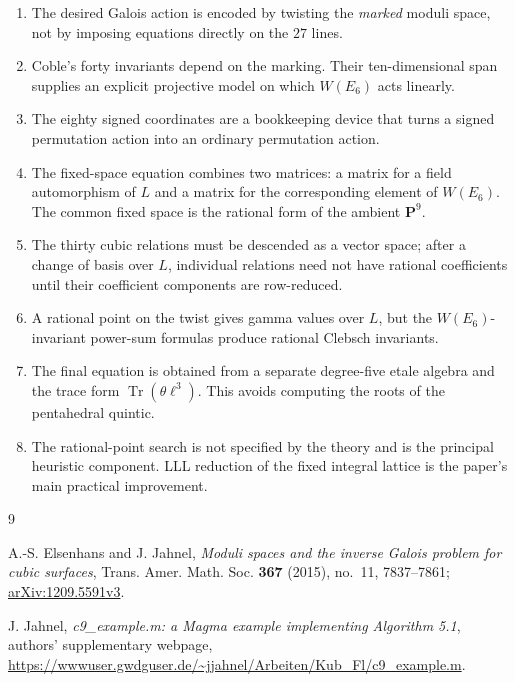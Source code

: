 \documentclass[11pt]{article}
\newcommand{\PP}{\mathbf{P}}
\newcommand{\Tr}{\operatorname{Tr}}
\begin{document}
\begin{enumerate}
\item The desired Galois action is encoded by twisting the \emph{marked}
moduli space, not by imposing equations directly on the $27$ lines.

\item Coble's forty invariants depend on the marking.  Their ten-dimensional
span supplies an explicit projective model on which $W(E_6)$ acts linearly.

\item The eighty signed coordinates are a bookkeeping device that turns a
signed permutation action into an ordinary permutation action.

\item The fixed-space equation combines two matrices: a matrix for a field
automorphism of $L$ and a matrix for the corresponding element of $W(E_6)$.
The common fixed space is the rational form of the ambient $\PP^9$.

\item The thirty cubic relations must be descended as a vector space; after a
change of basis over $L$, individual relations need not have rational
coefficients until their coefficient components are row-reduced.

\item A rational point on the twist gives gamma values over $L$, but the
$W(E_6)$-invariant power-sum formulas produce rational Clebsch invariants.

\item The final equation is obtained from a separate degree-five etale algebra
and the trace form $\Tr(\theta\ell^3)$.  This avoids computing the roots of the
pentahedral quintic.

\item The rational-point search is not specified by the theory and is the
principal heuristic component.  LLL reduction of the fixed integral lattice
is the paper's main practical improvement.
\end{enumerate}

\begin{thebibliography}{9}

A.-S. Elsenhans and J. Jahnel,
\emph{Moduli spaces and the inverse Galois problem for cubic surfaces},
Trans. Amer. Math. Soc. \textbf{367} (2015), no.~11, 7837--7861;
\href{https://arxiv.org/abs/1209.5591}{arXiv:1209.5591v3}.

J. Jahnel,
\emph{c9\_example.m: a Magma example implementing Algorithm 5.1},
authors' supplementary webpage,
\url{https://wwwuser.gwdguser.de/~jjahnel/Arbeiten/Kub_Fl/c9_example.m}.

\end{thebibliography}
\end{document}
